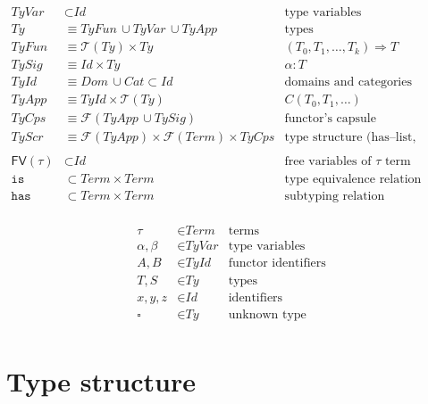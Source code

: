 \documentclass[10pt]{article}
\newcommand\Fin{\mathcal{F}}
\newcommand\Tup{\mathcal{T}}
\newcommand\FV{\mathsf{FV}}
\newcommand\Dom{\textit{Dom}}
\newcommand\Cat{\textit{Cat}}
\newcommand\Term{\textit{Term}}
\newcommand\Id{\textit{Id}}
\newcommand\Ty{\textit{Ty}}
\newcommand\TyId{\textit{TyId}}
\newcommand\TyApp{\textit{TyApp}}
\newcommand\TyFun{\textit{TyFun}}
\newcommand\TySig{\textit{TySig}}
\newcommand\TyVar{\textit{TyVar}}
\newcommand\TyCps{\textit{TyCps}}
\newcommand\TyScr{\textit{TyScr}}
\newcommand\Thas{\mathrel{\texttt{has}}}
\newcommand\Tis{\mathrel{\texttt{is}}}
\begin{document}
\begin{minipage}{\textwidth}
  \begin{align*}
    \TyVar & \subset \Id
      & \text{type variables} \\
    \Ty & \equiv \TyFun \,\cup \TyVar \,\cup \TyApp
      & \text{types} \\
    \TyFun & \equiv \Tup(\Ty) \times \Ty
      & (T_0, T_1, \ldots, T_k) \Rightarrow T \\
    \TySig & \equiv \Id \times \Ty
      & \alpha : T \\
    \TyId & \equiv \Dom \,\cup \Cat \subset \Id
      & \text{domains and categories identifiers} \\
    \TyApp & \equiv \TyId \times \Tup(\Ty)
      & C(T_{0}, T_{1}, \ldots) \\
    \TyCps & \equiv \Fin(\TyApp\,\cup \TySig)
      & \text{functor's capsule} \\
    \TyScr & \equiv \Fin(\TyApp) \times \Fin(\Term) \times \TyCps
      & \text{type structure (has--list, constraints, capsule)} \\
    \\
    \FV(\tau) & \subset \Id
      & \text{free variables of $\tau$ term} \\
    \Tis & \subset \Term \times \Term & \text{type equivalence relation} \\
    \Thas & \subset \Term \times \Term & \text{subtyping relation} \\
  \end{align*}

  \begin{align*}
    \tau & \in \Term & \text{terms} \\
    \alpha, \beta & \in \TyVar & \text{type variables} \\
    A, B & \in \TyId & \text{functor identifiers} \\
    T, S & \in \Ty & \text{types} \\
    x, y, z & \in \Id & \text{identifiers} \\
    \square & \in \Ty & \text{unknown type} \\
  \end{align*}
\end{minipage}

\clearpage
\section*{Type structure}
\end{document}
